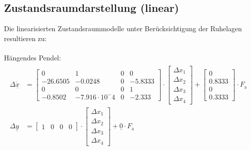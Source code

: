 \documentclass[
	pagesize,
	fontsize=12pt,
	paper=a4,
	oneside,
   reqno
]{scrartcl}
\begin{document}
\subsection{Zustandsraumdarstellung (linear)}

Die linearisierten Zustandsraummodelle unter Berücksichtigung der Ruhelagen resultieren zu:\\
\\Hängendes Pendel:
\begin{align}\label{eq:Gleichung32}
    \begin{split}
        \Delta{\dot{\underline{x}}}&=
        \begin{bmatrix}
            0 & 1 & 0 & 0 \\
            -26.6505 & -0.0248 & 0 & -5.8333 \\
            0 & 0 & 0 & 1 \\
            -0.8502 & -7.916\cdot10^-4 & 0 & -2.333
        \end{bmatrix}\cdot
        \begin{bmatrix}
            \Delta{x_{\mathrm{1}}} \\ \Delta{x_{\mathrm{2}}} \\ \Delta{x_{\mathrm{3}}} \\ \Delta{x_{\mathrm{4}}}
        \end{bmatrix}+
        \begin{bmatrix}
            0 \\
            0.8333 \\
            0 \\
            0.3333
        \end{bmatrix}\cdot F_{\mathrm{a}}
        \\
        \Delta{\underline{y}} &=
        \begin{bmatrix}
            1 & 0 & 0 & 0
        \end{bmatrix}\cdot
        \begin{bmatrix}
            \Delta{x_{\mathrm{1}}}\\
            \Delta{x_{\mathrm{2}}}\\
            \Delta{x_{\mathrm{3}}}\\
            \Delta{x_{\mathrm{4}}}
        \end{bmatrix}+\underline{0}\cdot F_{\mathrm{a}}
    \end{split}
\end{align}\\
\end{document}
